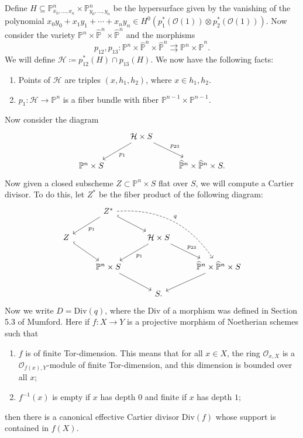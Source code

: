 \documentclass[leqno, openany]{memoir}
\theoremstyle{definition}
\theoremstyle{remark}
\theoremstyle{plain}
\theoremstyle{definition}
\theoremstyle{remark}
\renewcommand{\P}{\mathbb{P}}
\newcommand{\mc}[1]{\mathcal{#1}}
\newcommand{\mr}[1]{\mathrm{#1}}
\newcommand{\wh}[1]{\widehat{#1}}
\begin{document}
Define $H \subseteq \P^n_{x_0, \ldots, x_n} \times \P^n_{y_0, \ldots, y_n}$ be
the hypersurface given by the vanishing of the polynomial $x_0 y_0 + x_1 y_1 +
\cdots + x_n y_n \in H^0(p_1^*(\mc{O}(1)) \otimes p_2^*(\mc{O}(1)))$. Now
consider the variety $\P^n \times \wh{\P}^n \times \wh{\P}^n$ and the morphisms
\[ p_{12}, p_{13} \colon \P^n \times \wh{\P}^n \times \wh{\P}^n
\rightrightarrows \P^n \times \wh{\P}^n. \] We will define $\mc{H} \coloneqq
p_{12}^*(H) \cap p_{13}(H)$. We now have the following facts: \begin{enumerate}
    \item Points of $\mc{H}$ are triples $(x, h_1, h_2)$, where $x \in h_1,
        h_2$.  \item $p_1 \colon \mc{H} \to \P^n$ is a fiber bundle with fiber
        $\P^{n-1} \times \P^{n-1}$.  \end{enumerate} Now consider the diagram
        \begin{equation*} \begin{tikzcd} & \mc{H} \times S \arrow{dl}{p_1}
        \arrow{dr}{p_{23}} \\ \P^n \times S & & \wh{\P}^n \times \wh{\P}^n
    \times S.  \end{tikzcd} \end{equation*} Now given a closed subscheme $Z
    \subset \P^n \times S$ flat over $S$, we will compute a Cartier divisor. To
    do this, let $Z^*$ be the fiber product of the following diagram:
    \begin{equation*} \begin{tikzcd} & Z^* \arrow{dl}{p_1}
        \arrow[hookrightarrow]{dr} \arrow[bend left=30,
        dashrightarrow]{ddrr}{q} \\ Z \arrow[hookrightarrow]{dr} & & \mc{H}
        \times S \arrow{dl}{p_1} \arrow{dr}{p_{23}} \\ & \P^n \times S
        \arrow{dr} & & \wh{\P}^n \times \wh{\P}^n \times S \arrow{dl} \\ & & S.
    \end{tikzcd} \end{equation*} Now we write $D = \mr{Div}(q)$, where the Div
    of a morphism was defined in Section 5.3 of Mumford. Here if $f \colon X
    \to Y$ is a projective morphism of Noetherian schemes such that
    \begin{enumerate} \item $f$ is of finite Tor-dimension. This means that for
        all $x \in X$, the ring $\mc{O}_{x,X}$ is a $\mc{O}_{f(x), Y}$-module
        of finite Tor-dimension, and this dimension is bounded over all $x$;
        \item $f^{-1}(x)$ is empty if $x$ has depth $0$ and finite if $x$ has
    depth $1$; \end{enumerate} then there is a canonical effective Cartier
    divisor $\mr{Div}(f)$ whose support is contained in $f(X)$.
\end{document}
